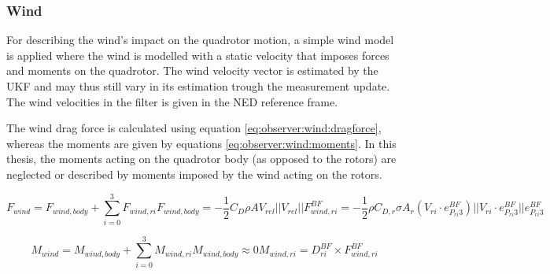 \subsubsection{Wind}
    For describing the wind's impact on the quadrotor motion,
    a simple wind model is applied where the wind is modelled with
    a static velocity that imposes forces and moments on the quadrotor.
    The wind velocity vector is estimated by the UKF and may thus still vary
    in its estimation trough the measurement update.
    The wind velocities in the filter is given in the NED reference frame.

    The wind drag force is calculated using equation \eqref{eq:observer:wind:dragforce},
    whereas the moments are given by equations \eqref{eq:observer:wind:moments}.
    In this thesis, the moments acting on the quadrotor body (as opposed to the rotors)
    are neglected or described by moments imposed by the wind acting on the rotors.

    \begin{subequations}
        \begin{equation}
            F_{wind} = F_{wind,body} + \sum_{i=0}^{3} F_{wind,ri}
        \end{equation}
        \begin{equation}
            F_{wind,body} = -\frac{1}{2} C_{D} \rho A V_{rel} ||V_{rel}||
        \end{equation}
        \begin{equation}
            F^{BF}_{wind,ri} = -\frac{1}{2} \rho C_{D,r} \sigma A_{r} (V_{ri} \cdot e_{P_{ri}3}^{BF}) ||V_{ri} \cdot e_{P_{ri}3}^{BF}|| e_{P_{ri}3}^{BF}
        \end{equation}
    \end{subequations}

    \begin{subequations}
        \begin{equation}
            M_{wind} = M_{wind,body} + \sum_{i=0}^{3}M_{wind,ri}
        \end{equation}
        \begin{equation}
            M_{wind,body} \approx 0 %
        \end{equation}
        \begin{equation}
            M_{wind,ri} = D_{ri}^{BF} \times F^{BF}_{wind,ri}
        \end{equation}
    \end{subequations}


